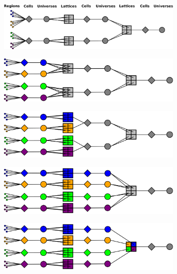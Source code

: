 \afterpage{\clearpage}
\begin{figure}[p]
\begin{subfigure}{\textwidth}
  \centering
  \includegraphics[width=0.82\linewidth]{figures/workflow/opencg/region-differentiation-1}
  \caption{}
  \label{fig:differentation-1}
\end{subfigure}
\begin{subfigure}{\textwidth}
  \centering
  \includegraphics[width=0.75\linewidth]{figures/workflow/opencg/region-differentiation-2}
  \caption{}
  \label{fig:differentation-2}
\end{subfigure}
\begin{subfigure}{\textwidth}
  \centering
  \includegraphics[width=0.75\linewidth]{figures/workflow/opencg/region-differentiation-3}
  \caption{}
  \label{fig:differentation-3}
\end{subfigure}
\begin{subfigure}{\textwidth}
  \centering
  \includegraphics[width=0.75\linewidth]{figures/workflow/opencg/region-differentiation-4}
  \caption{}
  \label{fig:differentation-4}
\end{subfigure}
\begin{subfigure}{\textwidth}
  \centering
  \includegraphics[width=0.75\linewidth]{figures/workflow/opencg/region-differentiation-5}

\end{subfigure}
\end{figure}

